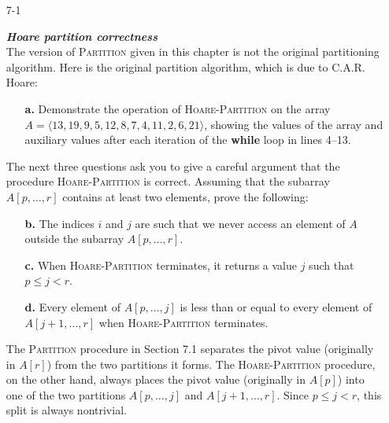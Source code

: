 \documentclass{report}
\let\oldnl\nl%
\newcommand{\nonl}{\renewcommand{\nl}{\let\nl\oldnl}}%
\begin{document}
\begin{enumerate}

\item[7{-}1]{\textbf{\emph{Hoare partition correctness}}\\
The version of \textsc{Partition} given in this chapter is not the original
partitioning algorithm. Here is the original partition algorithm, which is
due to C.A.R. Hoare:

\begin{algorithm}[H]
\SetAlgoNoEnd\DontPrintSemicolon
\BlankLine
{}
\nonl{}
\end{algorithm}

\begin{enumerate}
\item[\textbf{a.}]{Demonstrate the operation of \textsc{Hoare-Partition} on the array
$A = \langle 13, 19, 9, 5, 12, 8, 7, 4, 11, 2, 6, 21 \rangle$, showing the
values of the array and auxiliary values after each iteration of the
\textbf{while} loop in lines 4{--}13.}
\end{enumerate}

The next three questions ask you to give a careful argument that the procedure
\textsc{Hoare-Partition} is correct. Assuming that the subarray $A[p, \dots, r]$
contains at least two elements, prove the following:

\begin{enumerate}
\item[\textbf{b.}]{The indices $i$ and $j$ are such that we never access an
element of $A$ outside the subarray $A[p, \dots, r]$.}
\item[\textbf{c.}]{When \textsc{Hoare-Partition} terminates, it returns a value
$j$ such that $p \le j < r$.}
\item[\textbf{d.}]{Every element of $A[p, \dots, j]$ is less than or equal to
every element of $A[j + 1, \dots, r]$ when \textsc{Hoare-Partition} terminates.}
\end{enumerate}

The \textsc{Partition} procedure in Section 7.1 separates the pivot value
(originally in $A[r]$) from the two partitions it forms. The
\textsc{Hoare-Partition} procedure, on the other hand, always places the pivot
value (originally in $A[p]$) into one of the two partitions $A[p, \dots, j]$
and $A[j + 1, \dots, r]$. Since $p \le j < r$, this split is always nontrivial.

}
\end{enumerate}
\end{document}
